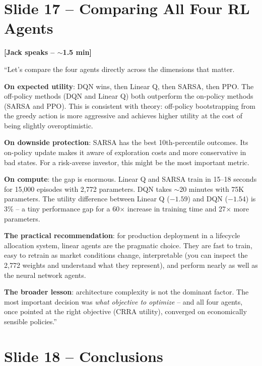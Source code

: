 \documentclass[11pt, letterpaper]{article}
\begin{document}
\section{Slide 17 -- Comparing All Four RL Agents}

\textbf{[Jack speaks -- $\sim$1.5 min]}

``Let's compare the four agents directly across the dimensions that matter.

\textbf{On expected utility}: DQN wins, then Linear Q, then SARSA, then PPO. The off-policy methods (DQN and Linear Q) both outperform the on-policy methods (SARSA and PPO). This is consistent with theory: off-policy bootstrapping from the greedy action is more aggressive and achieves higher utility at the cost of being slightly overoptimistic.

\textbf{On downside protection}: SARSA has the best 10th-percentile outcomes. Its on-policy update makes it aware of exploration costs and more conservative in bad states. For a risk-averse investor, this might be the most important metric.

\textbf{On compute}: the gap is enormous. Linear Q and SARSA train in 15--18 seconds for 15,000 episodes with 2,772 parameters. DQN takes $\sim$20 minutes with 75K parameters. The utility difference between Linear Q ($-1.59$) and DQN ($-1.54$) is 3\% -- a tiny performance gap for a 60$\times$ increase in training time and 27$\times$ more parameters.

\textbf{The practical recommendation}: for production deployment in a lifecycle allocation system, linear agents are the pragmatic choice. They are fast to train, easy to retrain as market conditions change, interpretable (you can inspect the 2,772 weights and understand what they represent), and perform nearly as well as the neural network agents.

\textbf{The broader lesson}: architecture complexity is not the dominant factor. The most important decision was \emph{what objective to optimize} -- and all four agents, once pointed at the right objective (CRRA utility), converged on economically sensible policies.''

\section{Slide 18 -- Conclusions}
\end{document}
